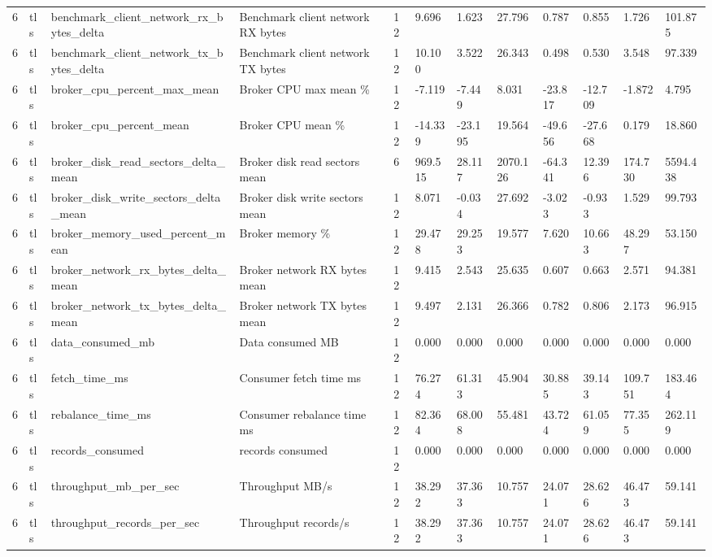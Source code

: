 \begin{longtable}{llllllllllll}
6 & tls & benchmark\_client\_network\_rx\_bytes\_delta & Benchmark client network RX bytes & 12 & 9.696 & 1.623 & 27.796 & 0.787 & 0.855 & 1.726 & 101.875 \\
6 & tls & benchmark\_client\_network\_tx\_bytes\_delta & Benchmark client network TX bytes & 12 & 10.100 & 3.522 & 26.343 & 0.498 & 0.530 & 3.548 & 97.339 \\
6 & tls & broker\_cpu\_percent\_max\_mean & Broker CPU max mean \% & 12 & -7.119 & -7.449 & 8.031 & -23.817 & -12.709 & -1.872 & 4.795 \\
6 & tls & broker\_cpu\_percent\_mean & Broker CPU mean \% & 12 & -14.339 & -23.195 & 19.564 & -49.656 & -27.668 & 0.179 & 18.860 \\
6 & tls & broker\_disk\_read\_sectors\_delta\_mean & Broker disk read sectors mean & 6 & 969.515 & 28.117 & 2070.126 & -64.341 & 12.396 & 174.730 & 5594.438 \\
6 & tls & broker\_disk\_write\_sectors\_delta\_mean & Broker disk write sectors mean & 12 & 8.071 & -0.034 & 27.692 & -3.023 & -0.933 & 1.529 & 99.793 \\
6 & tls & broker\_memory\_used\_percent\_mean & Broker memory \% & 12 & 29.478 & 29.253 & 19.577 & 7.620 & 10.663 & 48.297 & 53.150 \\
6 & tls & broker\_network\_rx\_bytes\_delta\_mean & Broker network RX bytes mean & 12 & 9.415 & 2.543 & 25.635 & 0.607 & 0.663 & 2.571 & 94.381 \\
6 & tls & broker\_network\_tx\_bytes\_delta\_mean & Broker network TX bytes mean & 12 & 9.497 & 2.131 & 26.366 & 0.782 & 0.806 & 2.173 & 96.915 \\
6 & tls & data\_consumed\_mb & Data consumed MB & 12 & 0.000 & 0.000 & 0.000 & 0.000 & 0.000 & 0.000 & 0.000 \\
6 & tls & fetch\_time\_ms & Consumer fetch time ms & 12 & 76.274 & 61.313 & 45.904 & 30.885 & 39.143 & 109.751 & 183.464 \\
6 & tls & rebalance\_time\_ms & Consumer rebalance time ms & 12 & 82.364 & 68.008 & 55.481 & 43.724 & 61.059 & 77.355 & 262.119 \\
6 & tls & records\_consumed & records consumed & 12 & 0.000 & 0.000 & 0.000 & 0.000 & 0.000 & 0.000 & 0.000 \\
6 & tls & throughput\_mb\_per\_sec & Throughput MB/s & 12 & 38.292 & 37.363 & 10.757 & 24.071 & 28.626 & 46.473 & 59.141 \\
6 & tls & throughput\_records\_per\_sec & Throughput records/s & 12 & 38.292 & 37.363 & 10.757 & 24.071 & 28.626 & 46.473 & 59.141 \\
\hline
\end{longtable}
